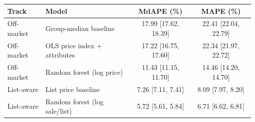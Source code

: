 \begin{tabular}{llcc}
\toprule
Track & Model & MdAPE (\%) & MAPE (\%) \\
\midrule
Off-market & Group-median baseline & 17.99 [17.62, 18.39] & 22.41 [22.04, 22.79] \\
Off-market & OLS price index + attributes & 17.22 [16.75, 17.60] & 22.34 [21.97, 22.72] \\
Off-market & Random forest (log price) & 11.43 [11.15, 11.70] & 14.46 [14.20, 14.70] \\
\midrule
List-aware & List price baseline & 7.26 [7.11, 7.41] & 8.09 [7.97, 8.20] \\
List-aware & Random forest (log sale/list) & 5.72 [5.61, 5.84] & 6.71 [6.62, 6.81] \\
\bottomrule
\end{tabular}
